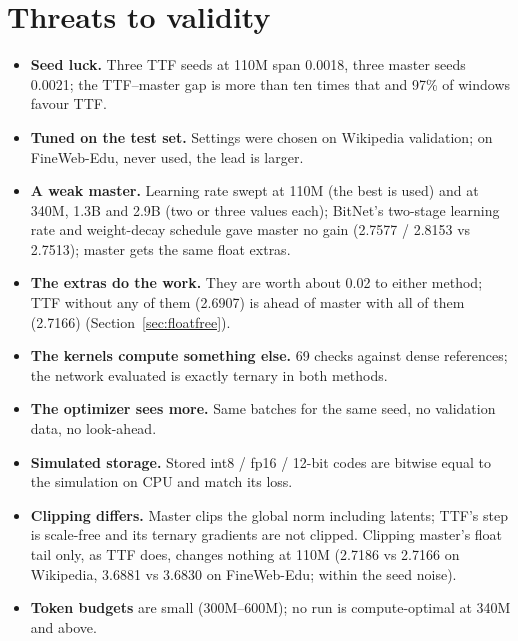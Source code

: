 \documentclass[10pt,twocolumn]{article}
\begin{document}
\section{Threats to validity}
\begin{itemize}
\item \textbf{Seed luck.} Three TTF seeds at 110M span 0.0018, three master seeds 0.0021; the TTF--master gap is
  more than ten times that and 97\% of windows favour TTF.
\item \textbf{Tuned on the test set.} Settings were chosen on Wikipedia validation; on FineWeb-Edu, never used, the
  lead is larger.
\item \textbf{A weak master.} Learning rate swept at 110M (the best is used) and at 340M, 1.3B and 2.9B (two or three
  values each); BitNet's two-stage learning rate and weight-decay schedule gave master no gain (2.7577 / 2.8153 vs
  2.7513); master gets the same float extras.
\item \textbf{The extras do the work.} They are worth about 0.02 to either method; TTF without any of them (2.6907) is
  ahead of master with all of them (2.7166) (Section~\ref{sec:floatfree}).
\item \textbf{The kernels compute something else.} 69 checks against dense references; the network evaluated is exactly
  ternary in both methods.
\item \textbf{The optimizer sees more.} Same batches for the same seed, no validation data, no look-ahead.
\item \textbf{Simulated storage.} Stored int8 / fp16 / 12-bit codes are bitwise equal to the simulation on CPU and
  match its loss.
\item \textbf{Clipping differs.} Master clips the global norm including latents; TTF's step is scale-free and its
  ternary gradients are not clipped. Clipping master's float tail only, as TTF does, changes nothing at 110M (2.7186
  vs 2.7166 on Wikipedia, 3.6881 vs 3.6830 on FineWeb-Edu; within the seed noise).
\item \textbf{Token budgets} are small (300M--600M); no run is compute-optimal at 340M and above.
\end{itemize}
\end{document}
